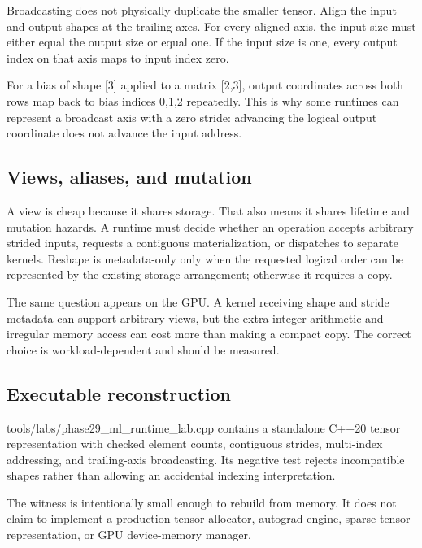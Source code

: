 Broadcasting does not physically duplicate the smaller tensor. Align the input and output shapes at the trailing axes. For every aligned axis, the input size must either equal the output size or equal one. If the input size is one, every output index on that axis maps to input index zero.

For a bias of shape {[}3{]} applied to a matrix {[}2,3{]}, output coordinates across both rows map back to bias indices 0,1,2 repeatedly. This is why some runtimes can represent a broadcast axis with a zero stride: advancing the logical output coordinate does not advance the input address.

\subsection{Views, aliases, and mutation}\label{appendix-cebadf3106d1-views-aliases-and-mutation}

\hypertarget{appendix-cebadf3106d1-views-aliases-and-mutation}{}

A view is cheap because it shares storage. That also means it shares lifetime and mutation hazards. A runtime must decide whether an operation accepts arbitrary strided inputs, requests a contiguous materialization, or dispatches to separate kernels. Reshape is metadata-only only when the requested logical order can be represented by the existing storage arrangement; otherwise it requires a copy.

The same question appears on the GPU. A kernel receiving shape and stride metadata can support arbitrary views, but the extra integer arithmetic and irregular memory access can cost more than making a compact copy. The correct choice is workload-dependent and should be measured.

\subsection{Executable reconstruction}\label{appendix-cebadf3106d1-executable-reconstruction}

\hypertarget{appendix-cebadf3106d1-executable-reconstruction}{}

tools/labs/phase29\_ml\_runtime\_lab.cpp contains a standalone C++20 tensor representation with checked element counts, contiguous strides, multi-index addressing, and trailing-axis broadcasting. Its negative test rejects incompatible shapes rather than allowing an accidental indexing interpretation.

The witness is intentionally small enough to rebuild from memory. It does not claim to implement a production tensor allocator, autograd engine, sparse tensor representation, or GPU device-memory manager.

